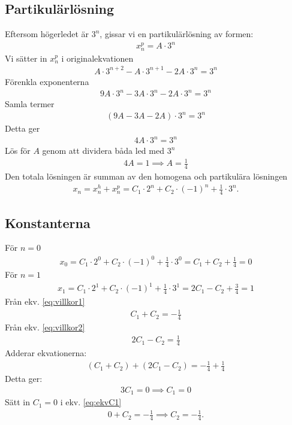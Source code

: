 \documentclass[a4paper,12pt]{article}
\begin{document}
\subsection*{Partikulärlösning}
Eftersom högerledet är $3^n$, gissar vi en partikulärlösning av formen:
\begin{align}
    x_n^p = A \cdot 3^n
\end{align}
Vi sätter in $x_n^p$ i originalekvationen
\begin{align}
    A \cdot 3^{n+2} - A \cdot 3^{n+1} - 2A \cdot 3^n = 3^n
\end{align}
Förenkla exponenterna
\begin{align}
    9A \cdot 3^n - 3A \cdot 3^n - 2A \cdot 3^n = 3^n
\end{align}
Samla termer
\begin{align}
    (9A - 3A - 2A) \cdot 3^n = 3^n
\end{align}
Detta ger
\begin{align}
    4A \cdot 3^n = 3^n
\end{align}
Lös för $A$ genom att dividera båda led med $3^n$
\begin{align}
    4A = 1 \implies A = \frac{1}{4}
\end{align}
Den totala lösningen är summan av den homogena och partikulära lösningen
\begin{align}
    x_n = x_n^h + x_n^p = C_1 \cdot 2^n + C_2 \cdot (-1)^n + \frac{1}{4} \cdot 3^n.
\end{align}
%
\subsection*{Konstanterna}
För $n = 0$
\begin{align}
    x_0 = C_1 \cdot 2^0 + C_2 \cdot (-1)^0 + \frac{1}{4} \cdot 3^0 = C_1 + C_2 + \frac{1}{4} = 0 \label{eq:villkor1}
\end{align}
För $n = 1$
\begin{align}
    x_1 = C_1 \cdot 2^1 + C_2 \cdot (-1)^1 + \frac{1}{4} \cdot 3^1 = 2C_1 - C_2 + \frac{3}{4} = 1 \label{eq:villkor2}
\end{align}
%
Från ekv. \ref{eq:villkor1}
\begin{align}
    C_1 + C_2 = -\frac{1}{4} \label{eq:ekvC1}
\end{align}
Från ekv. \ref{eq:villkor2}
\begin{align}
    2C_1 - C_2 = \frac{1}{4} \label{eq:ekvC2}
\end{align}
Adderar ekvationerna:
\begin{align}
    (C_1 + C_2) + (2C_1 - C_2) = -\frac{1}{4} + \frac{1}{4}
\end{align}
Detta ger:
\begin{align}
    3C_1 = 0 \implies C_1 = 0
\end{align}
Sätt in $C_1 = 0$ i ekv. \ref{eq:ekvC1}
\begin{align}
    0 + C_2 = -\frac{1}{4} \implies C_2 = -\frac{1}{4}.
\end{align}
%
\end{document}
